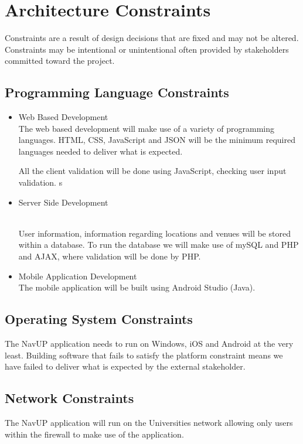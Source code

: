 \documentclass{article}
\begin{document}
	\section{Architecture Constraints}
	Constraints are a result of design decisions that are fixed and may not be altered. Constraints may be intentional or unintentional often provided by stakeholders committed toward the project.
		
		\subsection{Programming Language Constraints}
			\begin{itemize}
 				\item Web Based Development
 				\bigskip
 				\\ 				
 				The web based development will make use of a variety of programming languages. HTML, CSS, JavaScript and JSON will be the minimum required languages needed to deliver what is expected.
 				
 				All the client validation will be done using JavaScript, checking user input validation.			
s 				
  				\item Server Side Development
  				\bigskip

\\
 				User information, information regarding locations and venues will be stored within a database. To run the database we will make use of mySQL and PHP and AJAX, where validation will be done by PHP.
 				
 				\item Mobile Application  Development
  				\bigskip
 				\\
 				The mobile application will be built using Android Studio (Java).
 							
			\end{itemize}


		\subsection{Operating System Constraints}			   
 				The NavUP application needs to run on Windows, iOS and Android at the very least. Building software that fails to satisfy the platform constraint means we have failed to deliver what is expected by the external stakeholder. 
 				
 		\subsection{Network Constraints}			 
 				The NavUP application will run on the Universities network allowing only users within the firewall to make use of the application.
 				
\end{document}
